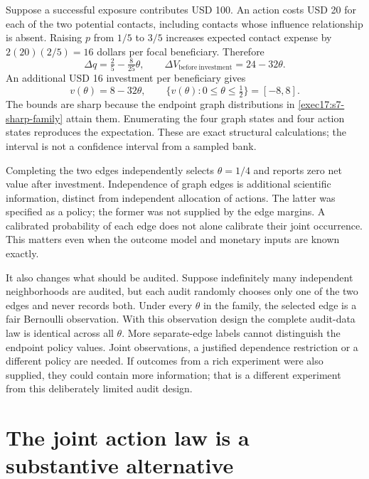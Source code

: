 Suppose a successful exposure contributes USD 100. An action costs USD 20
for each of the two potential contacts, including contacts whose influence
relationship is absent. Raising $p$ from $1/5$ to $3/5$ increases expected contact
expense by $2(20)(2/5)=16$ dollars per focal beneficiary. Therefore
\begin{equation}
 \Delta q=\tfrac25-\tfrac8{25}\theta,
 \qquad \Delta V_{\mathrm{before\ investment}}=24-32\theta.
 \label{exec17:s7-graph-value}
\end{equation}
An additional USD 16 investment per beneficiary gives
\begin{equation}
 v(\theta)=8-32\theta,\qquad
 \{v(\theta):0\leq\theta\leq\tfrac12\}=[-8,8].
 \label{exec17:s7-graph-set}
\end{equation}
The bounds are sharp because the endpoint graph distributions in
\eqref{exec17:s7-sharp-family} attain them. Enumerating the four graph states
and four action states reproduces the expectation. These are exact structural
calculations; the interval is not a confidence interval from a sampled bank.
\citep{exec17_s7_math}

Completing the two edges independently selects $\theta=1/4$ and reports zero
net value after investment. Independence of graph edges is additional scientific
information, distinct from independent allocation of actions. The latter was
specified as a policy; the former was not supplied by the edge margins. A
calibrated probability of each edge does not alone calibrate their joint
occurrence. This matters even when the outcome model and monetary inputs are
known exactly.

It also changes what should be audited. Suppose indefinitely many independent
neighborhoods are audited, but each audit randomly chooses only one of the two
edges and never records both. Under every $\theta$ in the family, the selected
edge is a fair Bernoulli observation. With this observation design the complete
audit-data law is identical across all $\theta$. More separate-edge labels
cannot distinguish the endpoint policy values. Joint observations, a justified
dependence restriction or a different policy are needed. If outcomes from a
rich experiment were also supplied, they could contain more information; that
is a different experiment from this deliberately limited audit design.

\section{The joint action law is a substantive alternative}
\label{exec17:s7-coordination}

